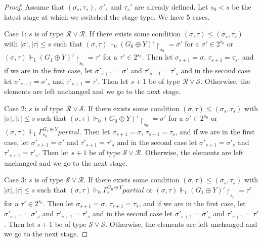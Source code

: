 \documentclass{article}
\numberwithin{theorem}{section}
\newcommand{\ludovic}[1]{\textcolor{blue}{#1}}
\newcommand{\quentin}[1]{\textcolor{green}{#1}}
\newcommand{\R}{\mathcal{R}}
\renewcommand{\S}{\mathcal{S}}
\renewcommand{\P}{\mathcal{P}}
\renewcommand{\P}{\mathcal{P}}
\newcommand{\uh}[0]{{\upharpoonright}}
\begin{document}
\begin{proof}
Assume that $(\sigma_s, \tau_s)$, $\sigma'_s$ and $\tau_s'$ are already defined. Let $s_0 < s$ be the latest stage at which we switched the stage type. We have 5 cases.


Case 1: $s$ is of type $\R \vee \R$. If there exists some condition $(\sigma,\tau) \leq (\sigma_s,\tau_s)$ with $|\sigma|,|\tau| \leq s$ such that $(\sigma,\tau) \Vdash_0 (G_0 \oplus Y)' \uh_{s_0} = \sigma'$ for a $\sigma' \in 2^{s_0}$ or $(\sigma,\tau) \Vdash_1 (G_1 \oplus Y)' \uh_{s_0} = \tau'$ for a $\tau' \in 2^{s_0}$. Then let $\sigma_{s+1} = \sigma$, $\tau_{s+1} = \tau_s$, and if we are in the first case, let $\sigma'_{s+1} = \sigma'$ and $\tau'_{s+1} = \tau'_s$ and in the second case let $\sigma'_{s+1} = \sigma'_s$ and $\tau'_{s+1} = \tau'$. Then let $s+1$ be of type $\R \vee \S$. Otherwise, the elements are left unchanged and we go to the next stage.

Case 2: $s$ is of type $\R \vee \S$. If there exists some condition $(\sigma,\tau) \leq (\sigma_s,\tau_s)$ with $|\sigma|,|\tau| \leq s$ such that $(\sigma,\tau) \Vdash_0 (G_0 \oplus Y)' \uh_{s_0} = \sigma'$ for a $\sigma' \in 2^{s_0}$ or $(\sigma,\tau) \Vdash_1 \Gamma_{s_0}^{G_1 \oplus Y} partial$. Then let $\sigma_{s+1} = \sigma$, $\tau_{s+1} = \tau_s$, and if we are in the first case, let $\sigma'_{s+1} = \sigma'$ and $\tau'_{s+1} = \tau'_s$ and in the second case let $\sigma'_{s+1} = \sigma'_s$ and $\tau'_{s+1} = \tau'_s$. Then let $s+1$ be of type $\S \vee \R$. Otherwise, the elements are left unchanged and we go to the next stage.

Case 3: $s$ is of type $\S \vee \R$. If there exists some condition $(\sigma,\tau) \leq (\sigma_s,\tau_s)$ with $|\sigma|,|\tau| \leq s$ such that $(\sigma,\tau) \Vdash_0\Gamma_{s_0}^{G_0 \oplus Y} partial$ or $(\sigma,\tau) \Vdash_1 (G_1 \oplus Y)' \uh_{s_0} = \tau'$ for a $\tau' \in 2^{s_0}$. Then let $\sigma_{s+1} = \sigma$, $\tau_{s+1} = \tau_s$, and if we are in the first case, let $\sigma'_{s+1} = \sigma'_s$ and $\tau'_{s+1} = \tau'_s$ and in the second case let $\sigma'_{s+1} = \sigma'_s$ and $\tau'_{s+1} = \tau'$. Then let $s+1$ be of type $\S \vee \S$. Otherwise, the elements are left unchanged and we go to the next stage.


\end{proof}
\end{document}
